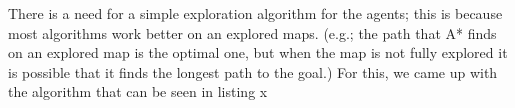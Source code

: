 There is a need for a simple exploration algorithm for the agents; this is because most algorithms work better on an explored maps. (e.g.; the path that A* finds on an explored map is the optimal one, but when the map is not fully explored it is possible that it finds the longest path to the goal.)
For this, we came up with the algorithm that can be seen in listing x

\begin{algorithm}
    \KwData{Current map $M$, 
\end{algorithm}